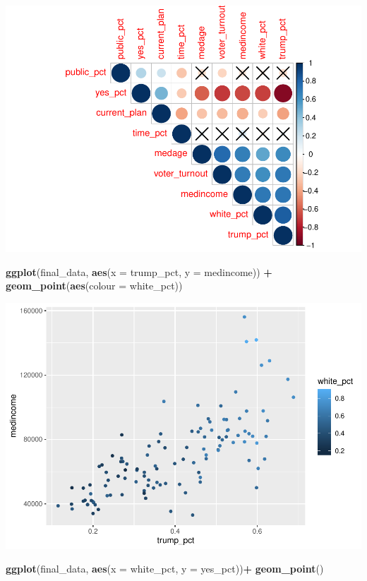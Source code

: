 \documentclass[
]{article}
\newenvironment{Shaded}{\begin{snugshade}}{\end{snugshade}}
\newcommand{\DataTypeTok}[1]{\textcolor[rgb]{0.13,0.29,0.53}{#1}}
\newcommand{\KeywordTok}[1]{\textcolor[rgb]{0.13,0.29,0.53}{\textbf{#1}}}
\newcommand{\NormalTok}[1]{#1}
\newcommand{\OperatorTok}[1]{\textcolor[rgb]{0.81,0.36,0.00}{\textbf{#1}}}
\newcommand{\StringTok}[1]{\textcolor[rgb]{0.31,0.60,0.02}{#1}}
\begin{document}
\includegraphics{Zhong_paper_files/figure-latex/unnamed-chunk-1-1.pdf}

\begin{Shaded}
\begin{Highlighting}[]
\KeywordTok{ggplot}\NormalTok{(final_data, }\KeywordTok{aes}\NormalTok{(}\DataTypeTok{x =}\NormalTok{ trump_pct, }\DataTypeTok{y =}\NormalTok{ medincome)) }\OperatorTok{+}
\StringTok{   }\KeywordTok{geom_point}\NormalTok{(}\KeywordTok{aes}\NormalTok{(}\DataTypeTok{colour =}\NormalTok{ white_pct))}
\end{Highlighting}
\end{Shaded}

\includegraphics{Zhong_paper_files/figure-latex/unnamed-chunk-2-1.pdf}

\begin{Shaded}
\begin{Highlighting}[]
\KeywordTok{ggplot}\NormalTok{(final_data, }\KeywordTok{aes}\NormalTok{(}\DataTypeTok{x =}\NormalTok{ white_pct, }\DataTypeTok{y =}\NormalTok{ yes_pct))}\OperatorTok{+}
\StringTok{   }\KeywordTok{geom_point}\NormalTok{()}
\end{Highlighting}
\end{Shaded}
\end{document}
